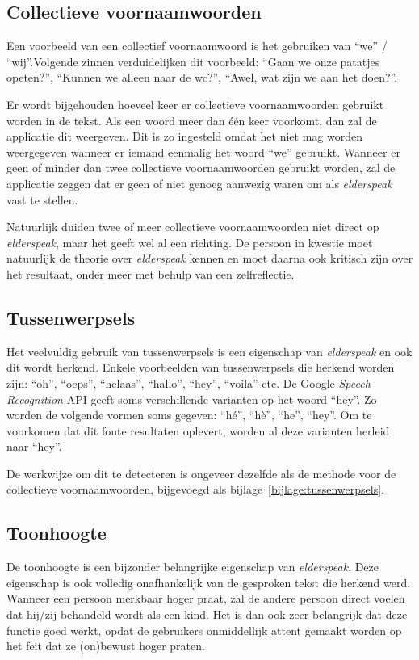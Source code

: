 \subsection{Collectieve voornaamwoorden}
Een voorbeeld van een collectief voornaamwoord is het gebruiken van ``we'' / ``wij''.Volgende zinnen verduidelijken dit voorbeeld: ``Gaan we onze patatjes opeten?'', ``Kunnen we alleen naar de wc?'', ``Awel, wat zijn we aan het doen?''.

Er wordt bijgehouden hoeveel keer er collectieve voornaamwoorden gebruikt worden in de tekst. Als een woord meer dan één keer voorkomt, dan zal de applicatie dit weergeven. Dit is zo ingesteld omdat het niet mag worden weergegeven wanneer er iemand eenmalig het woord ``we'' gebruikt.
Wanneer er geen of minder dan twee collectieve voornaamwoorden gebruikt worden, zal de applicatie zeggen dat er geen of niet genoeg aanwezig waren om als \textit{elderspeak} vast te stellen.

Natuurlijk duiden twee of meer collectieve voornaamwoorden niet direct op \textit{elderspeak}, maar het geeft wel al een richting. De persoon in kwestie moet natuurlijk de theorie over \textit{elderspeak} kennen en moet daarna ook kritisch zijn over het resultaat, onder meer met behulp van een zelfreflectie.

\subsection{Tussenwerpsels}
Het veelvuldig gebruik van tussenwerpsels is een eigenschap van \textit{elderspeak} en ook dit wordt herkend. Enkele voorbeelden van tussenwerpsels die herkend worden zijn: ``oh'', ``oeps'', ``helaas'', ``hallo'', ``hey'', ``voila'' etc. De Google \textit{Speech Recognition}-API geeft soms verschillende varianten op het woord ``hey''. Zo worden de volgende vormen soms gegeven: ``hé'', ``hè'', ``he'', ``hey''. Om te voorkomen dat dit foute resultaten oplevert, worden al deze varianten herleid naar ``hey''.

De werkwijze om dit te detecteren is ongeveer dezelfde als de methode voor de collectieve voornaamwoorden, bijgevoegd als bijlage~\ref{bijlage:tussenwerpsels}.

\subsection{Toonhoogte}
De toonhoogte is een bijzonder belangrijke eigenschap van \textit{elderspeak}. Deze eigenschap is ook volledig onafhankelijk van de gesproken tekst die herkend werd. Wanneer een persoon merkbaar hoger praat, zal de andere persoon direct voelen dat hij/zij behandeld wordt als een kind. Het is dan ook zeer belangrijk dat deze functie goed werkt, opdat de gebruikers onmiddellijk attent gemaakt worden op het feit dat ze (on)bewust hoger praten.

